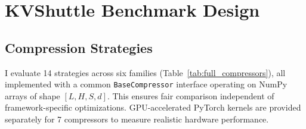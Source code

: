 \documentclass{article}
\begin{document}
\section{KVShuttle Benchmark Design}
\label{sec:design}

\subsection{Compression Strategies}

I evaluate 14 strategies across six families (Table~\ref{tab:full_compressors}), all implemented with a common \texttt{BaseCompressor} interface operating on NumPy arrays of shape $[L, H, S, d]$. This ensures fair comparison independent of framework-specific optimizations. GPU-accelerated PyTorch kernels are provided separately for 7 compressors to measure realistic hardware performance.
\end{document}
